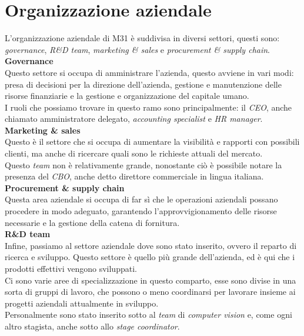 \section{Organizzazione aziendale}\noindent
L'organizzazione aziendale di M31 è suddivisa in diversi settori, questi sono: \textit{governance}, \textit{R\&D team}, \textit{marketing \& sales} e \textit{procurement \& supply chain}.\\
\textbf{Governance}\\
Questo settore si occupa di amministrare l'azienda, questo avviene in vari modi: presa di decisioni per la direzione dell'azienda, gestione e manutenzione delle risorse finanziarie e la gestione e organizzazione del capitale umano.\\
I ruoli che possiamo trovare in questo ramo sono principalmente: il \textit{CEO}, anche chiamato amministratore delegato, \textit{accounting specialist} e \textit{HR manager}.\\
\textbf{Marketing \& sales}\\
Questo è il settore che si occupa di aumentare la visibilità e rapporti con possibili clienti, ma anche di ricercare quali sono le richieste attuali del mercato.\\
Questo \textit{team} non è relativamente grande, nonostante ciò è possibile notare la presenza del \textit{CBO}, anche detto direttore commerciale in lingua italiana.\\ 
\textbf{Procurement \& supply chain}\\
Questa area aziendale si occupa di far sì che le operazioni aziendali possano procedere in modo adeguato, garantendo l'approvvigionamento delle risorse necessarie e la gestione della catena di fornitura.\\
\textbf{R\&D team}\\
Infine, passiamo al settore aziendale dove sono stato inserito, ovvero il reparto di ricerca e sviluppo. Questo settore è quello più grande dell'azienda, ed è qui che i prodotti effettivi vengono sviluppati.\\
Ci sono varie aree di specializzazione in questo comparto, esse sono divise in una sorta di gruppi di lavoro, che possono o meno coordinarsi per lavorare insieme ai progetti aziendali attualmente in sviluppo.\\
Personalmente sono stato inserito sotto al \textit{team} di \textit{computer vision} e, come ogni altro stagista, anche sotto allo \textit{stage coordinator}.

